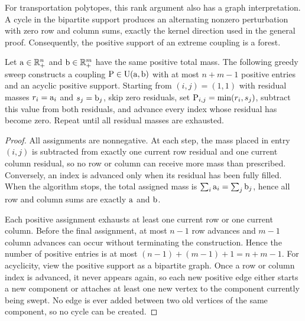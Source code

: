 For transportation polytopes, this rank argument also has a graph interpretation. A cycle in the bipartite support produces an alternating nonzero perturbation with zero row and column sums, exactly the kernel direction used in the general proof. Consequently, the positive support of an extreme coupling is a forest.

\begin{prop}\label{prop-northwest-corner}
	Let $\a\in\RR_+^n$ and $\b\in\RR_+^m$ have the same positive total mass. The following greedy sweep constructs a coupling $\P\in\CouplingsD(\a,\b)$ with at most $n+m-1$ positive entries and an acyclic positive support. Starting from $(i,j)=(1,1)$ with residual masses $r_i=\a_i$ and $s_j=\b_j$, skip zero residuals, set $\P_{i,j}=\min(r_i,s_j)$,
	subtract this value from both residuals, and advance every index whose residual has become zero. Repeat until all residual masses are exhausted.
\end{prop}
\begin{proof}
	All assignments are nonnegative. At each step, the mass placed in entry $(i,j)$ is subtracted from exactly one current row residual and one current column residual, so no row or column can receive more mass than prescribed. Conversely, an index is advanced only when its residual has been fully filled. When the algorithm stops, the total assigned mass is $\sum_i \a_i=\sum_j \b_j$, hence all row and column sums are exactly $\a$ and $\b$.

	Each positive assignment exhausts at least one current row or one current column. Before the final assignment, at most $n-1$ row advances and $m-1$ column advances can occur without terminating the construction. Hence the number of positive entries is at most $(n-1)+(m-1)+1=n+m-1$. For acyclicity, view the positive support as a bipartite graph. Once a row or column index is advanced, it never appears again, so each new positive edge either starts a new component or attaches at least one new vertex to the component currently being swept. No edge is ever added between two old vertices of the same component, so no cycle can be created.
\end{proof}

